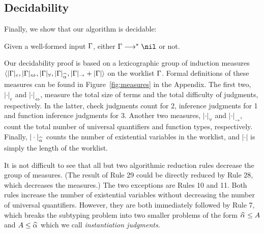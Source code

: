 \subsection{Decidability}

Finally, we show that our algorithm is decidable:
\begin{theorem}[Decidability]
Given a well-formed input $\Gamma$, either $\Gm\redto\nil$ or not.
\end{theorem}
Our decidability proof is based on a lexicographic group of induction measures\\
$\langle |\Gm|_e, |\Gm|_\Leftrightarrow, |\Gm|_\forall, |\Gm|_{\al}, |\Gm|_\to + |\Gm| \rangle$
on the worklist $\Gamma$. Formal definitions of these measures can be found in
Figure~\ref{fig:measures} in the Appendix. The first two, 
$|\cdot|_e$ and $|\cdot|_\Leftrightarrow$, measure the total size of terms
and the total difficulty of judgments, respectively. In the latter, check judgments
count for 2, inference judgments for 1 and function inference judgments for 3.
Another two measures, $|\cdot|_\forall$ and $|\cdot|_\to$, count the total number of
universal quantifiers and function types, respectively. Finally,
$|\cdot|_{\al}$ counts the number of existential variables in the worklist,
and $|\cdot|$ is simply the length of the worklist.

It is not difficult to see that all but two algorithmic reduction rules
decrease the group of measures.  (The result of Rule 29 could be directly
reduced by Rule 28, which decreases the measures.) The two exceptions are Rules
10 and 11. Both rules increase the number of existential variables without
decreasing the number of universal quantifiers. However, they are both
immediately followed by Rule 7, which breaks the subtyping problem into two
smaller problems of the form $\al \le A$ and $A \le \al$ which we call
\emph{instantiation judgments}.

